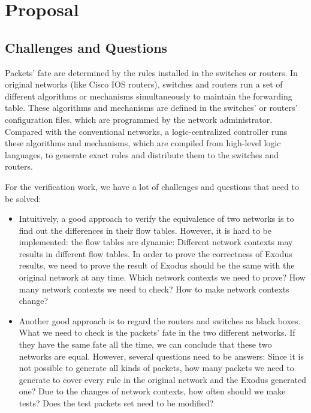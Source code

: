 \documentclass[11pt]{article}
\begin{document}
\section{Proposal}

\subsection{Challenges and Questions}
\par Packets' fate are determined by the rules installed in the switches or routers. In original networks (like Cisco IOS routers), switches and routers run a set of different algorithms or mechanisms simultaneously to maintain the forwarding table. These algorithms and mechanisms are defined in the switches' or routers' configuration files, which are programmed by the network administrator. Compared with the conventional networks, a logic-centralized controller runs these algorithms and mechanisms, which are compiled from high-level logic languages, to generate exact rules and distribute them to the switches and routers.
\par For the verification work, we have a lot of challenges and questions that need to be solved:
\begin{itemize}
\item Intuitively, a good approach to verify the equivalence of two networks is to find out the differences in their flow tables. However, it is hard to be implemented: the flow tables are dynamic: Different network contexts may results in different flow tables. In order to prove the correctness of Exodus results, we need to prove the result of Exodus should be the same with the original network at any time. Which network contexts we need to prove? How many network contexts we need to check? How to make network contexts change?
\item Another good approach is to regard the routers and switches as black boxes. What we need to check is the packets' fate in the two different networks. If they have the same fate all the time, we can conclude that these two networks are equal. However, several questions need to be answers: Since it is not possible to generate all kinds of packets, how many packets we need to generate to cover every rule in the original network and the Exodus generated one? Due to the changes of network contexts, how often should we make tests? Does the test packets set need to be modified?
\end{itemize}
\end{document}
